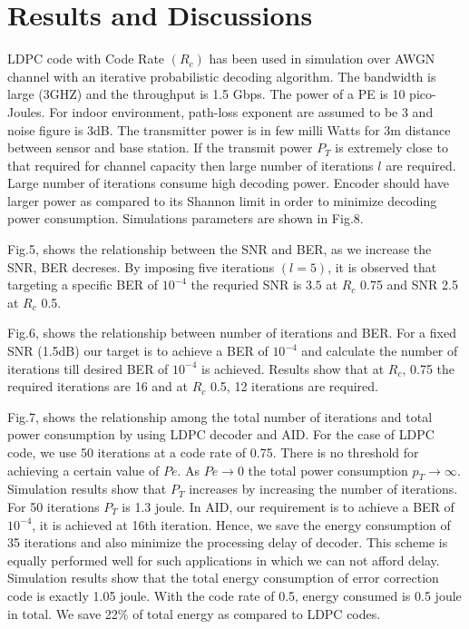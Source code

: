 \documentclass[3p,times,procedia]{elsarticle}
\begin{document}
\vspace{-1cm}
\section{Results and Discussions}
\label{sec:typestyle}
\vspace{-0.3cm}

LDPC code with Code Rate $(R_c)$ has been used in simulation over AWGN channel with an iterative probabilistic decoding algorithm.
The bandwidth is large (3GHZ) and the throughput is 1.5 Gbps. The power of a PE is 10 pico-Joules. For indoor environment, path-loss exponent are assumed to be 3 and noise figure is 3dB. The transmitter power is in few milli Watts for 3m distance between sensor and base station. If the transmit power $P_T$ is extremely close to that required for channel capacity then large number of iterations $l$ are required. Large number of iterations consume high decoding power. Encoder should have larger power as compared to its Shannon limit in order to minimize decoding power consumption. Simulations parameters are shown in Fig.8.





Fig.5, shows the relationship between the SNR and BER, as we increase the SNR, BER decreses. By imposing five iterations $(l=5)$, it is observed that targeting a specific BER of $10^{-4}$ the requried SNR is $3.5$ at $R_c$ 0.75 and SNR 2.5 at $R_c$ 0.5.

Fig.6, shows the relationship between number of iterations and BER. For a fixed SNR (1.5dB) our target is to achieve a  BER of $10^{-4}$ and calculate the number of iterations till desired BER of $10^{-4}$ is achieved. Results show that at $R_c$, 0.75 the required iterations are 16 and at $R_c$ 0.5, 12 iterations are required.

Fig.7, shows the relationship among the total number of iterations and total power consumption by using LDPC decoder and AID. For the case of LDPC code, we use 50 iterations at a code rate of 0.75. There is no threshold for achieving a certain value of $Pe$. As $Pe \rightarrow 0$ the total power consumption $p_T \rightarrow \infty$. Simulation results show that $P_T$ increases by increasing the number of iterations. For 50 iterations $P_T$ is 1.3 joule.
In AID, our requirement is to achieve a BER of $10^{-4}$, it is achieved at 16th iteration. Hence, we save the energy consumption of 35 iterations and also minimize the processing delay of decoder. This scheme is equally performed well for such applications in which we can not afford delay. Simulation results show that the total energy consumption of error correction code is exactly 1.05 joule. With the code rate of 0.5, energy consumed is 0.5 joule in total. We save 22$\%$ of total energy as compared to LDPC codes.
\end{document}
